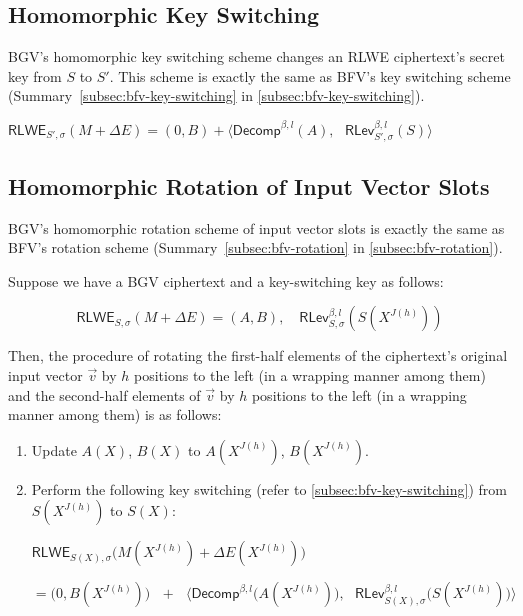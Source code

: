 \subsection{Homomorphic Key Switching}
\label{subsec:bgv-key-switching}

BGV's homomorphic key switching scheme changes an RLWE ciphertext's secret key from $S$ to $S'$. This scheme is exactly the same as BFV's key switching scheme (Summary~\ref*{subsec:bfv-key-switching} in \autoref{subsec:bfv-key-switching}).

\begin{tcolorbox}[title={\textbf{\tboxlabel{\ref*{subsec:bgv-key-switching}} BGV's Key Switching}}]
$\textsf{RLWE}_{S',\sigma}(M + \Delta E) = (0, B) + \bm{\langle} \textsf{Decomp}^{\beta, l}(A), \text{ } \textsf{RLev}_{S', \sigma}^{\beta, l}(S) \bm{\rangle}$
\end{tcolorbox}



\subsection{Homomorphic Rotation of Input Vector Slots}
\label{subsec:bgv-rotation}


BGV's homomorphic rotation scheme of input vector slots is exactly the same as BFV's rotation scheme (Summary~\ref*{subsec:bfv-rotation} in \autoref{subsec:bfv-rotation}). 


\begin{tcolorbox}[title={\textbf{\tboxlabel{\ref*{subsec:bgv-rotation}} BGV's Homomorphic Rotation of Input Vector Slots}}]


Suppose we have a BGV ciphertext and a key-switching key as follows:

\[
\textsf{RLWE}_{S, \sigma}(M + \Delta E) = (A, B), \quad \textsf{RLev}_{S, \sigma}^{\beta, l}(S(X^{J(h)}))
\]

Then, the procedure of rotating the first-half elements of the ciphertext's original input vector $\vec{v}$ by $h$ positions to the left (in a wrapping manner among them) and the second-half elements of $\vec{v}$ by $h$ positions to the left (in a wrapping manner among them) is as follows: 

\begin{enumerate}
\item Update $A(X)$, $B(X)$ to $A(X^{J(h)})$, $B(X^{J(h)})$. 
\item Perform the following key switching (refer to \autoref{subsec:bfv-key-switching}) from $S(X^{J(h)})$ to $S(X)$:

$\textsf{RLWE}_{S(X),\sigma}\bm{(} M(X^{J(h)}) + \Delta E(X^{J(h)})\bm{)} $

$= \bm{(} 0, B(X^{J(h)}) \bm{)} \text{ } + \text{ } \bm{\langle}  \textsf{Decomp}^{\beta, l}\bm{(}A(X^{J(h)})\bm{)}, \text{ } \textsf{RLev}_{S(X), \sigma}^{\beta, l}\bm{(}S(X^{J(h)})\bm{)} \bm{\rangle}$
\end{enumerate}


\end{tcolorbox}




